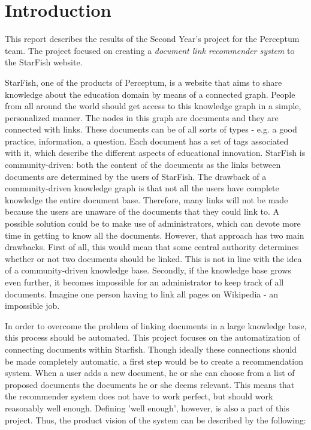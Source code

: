 

\section{Introduction}

This report describes the results of the Second Year's project for the Perceptum team. The project focused on creating a \emph{document link recommender system} to the StarFish website. 

StarFish, one of the products of Perceptum, is a website that aims to share knowledge about the education domain by means of a connected graph. People from all around the world should get access to this knowledge graph in a simple, personalized manner. The nodes in this graph are documents and they are connected with links. These documents can be of all sorts of types - e.g. a good practice, information, a question. Each document has a set of tags associated with it, which describe the different aspects of educational innovation. StarFish is community-driven: both the content of the documents as the links between documents are determined by the users of StarFish. The drawback of a community-driven knowledge graph is that not all the users have complete knowledge the entire document base. Therefore, many links will not be made because the users are unaware of the documents that they could link to. A possible solution could be to make use of administrators, which can devote more time in getting to know all the documents. However, that approach has two main drawbacks. First of all, this would mean that some central authority determines whether or not two documents should be linked. This is not in line with the idea of a community-driven knowledge base. Secondly, if the knowledge base grows even further, it becomes impossible for an administrator to keep track of all documents. Imagine one person having to link all pages on Wikipedia - an impossible job. 

In order to overcome the problem of linking documents in a large knowledge base, this process should be automated. This project focuses on the automatization of connecting documents within Starfish. Though ideally these connections should be made completely automatic, a first step would be to create a recommendation system. When a user adds a new document, he or she can choose from a list of proposed documents the documents he or she deems relevant. This means that the recommender system does not have to work perfect, but should work reasonably well enough. Defining 'well enough', however, is also a part of this project. Thus, the product vision of the system can be described by the following:

